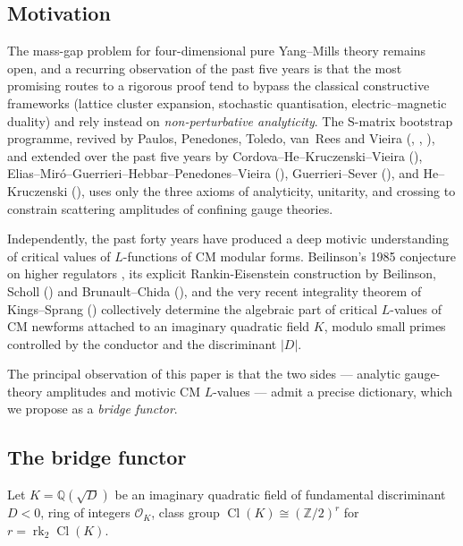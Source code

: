 \documentclass[11pt]{amsart}
\theoremstyle{definition}
\theoremstyle{remark}
\DeclareMathOperator{\Cl}{Cl}
\DeclareMathOperator{\rk}{rk}
\newcommand{\Q}{\mathbb{Q}}
\newcommand{\Z}{\mathbb{Z}}
\newcommand{\OK}{\mathcal{O}_K}
\begin{document}
\subsection{Motivation}\label{ss:motivation}

The mass-gap problem for four-dimensional pure Yang--Mills theory remains
open, and a recurring observation of the past five years is that the most
promising routes to a rigorous proof tend to bypass the classical
constructive frameworks (lattice cluster expansion, stochastic
quantisation, electric--magnetic duality) and rely instead on
\emph{non-perturbative analyticity}. The S-matrix bootstrap programme,
revived by Paulos, Penedones, Toledo, van~Rees and Vieira
(\cite{PaulosI}, \cite{PaulosII}, \cite{PaulosIII}), and extended over
the past five years by Cordova--He--Kruczenski--Vieira (\cite{CordovaHeKruczenskiVieira}),
Elias--Mir\'o--Guerrieri--Hebbar--Penedones--Vieira (\cite{EliasMiroFluxTube}),
Guerrieri--Sever (\cite{GuerrieriSever}), and He--Kruczenski
(\cite{HeKruczenski23,HeKruczenski24}), uses only the three axioms of
analyticity, unitarity, and crossing to constrain scattering amplitudes
of confining gauge theories.

Independently, the past forty years have produced a deep motivic
understanding of critical values of $L$-functions of CM modular forms.
Beilinson's 1985 conjecture on higher regulators \cite{Beilinson1985},
its explicit Rankin-Eisenstein construction by Beilinson, Scholl
(\cite{Scholl1990}) and Brunault--Chida (\cite{BrunaultChida2015}), and
the very recent integrality theorem of Kings--Sprang
(\cite{KingsSprang2025}) collectively determine the algebraic part of
critical $L$-values of CM newforms attached to an imaginary quadratic
field $K$, modulo small primes controlled by the conductor and the
discriminant $|D|$.

The principal observation of this paper is that the two sides --- analytic
gauge-theory amplitudes and motivic CM $L$-values --- admit a precise
dictionary, which we propose as a \emph{bridge functor}.

\subsection{The bridge functor}\label{ss:bridge-functor-intro}

Let $K = \Q(\sqrt{D})$ be an imaginary quadratic field of fundamental
discriminant $D < 0$, ring of integers $\OK$, class group $\Cl(K) \cong
(\Z/2)^{r}$ for $r = \rk_2 \Cl(K)$.
\end{document}
